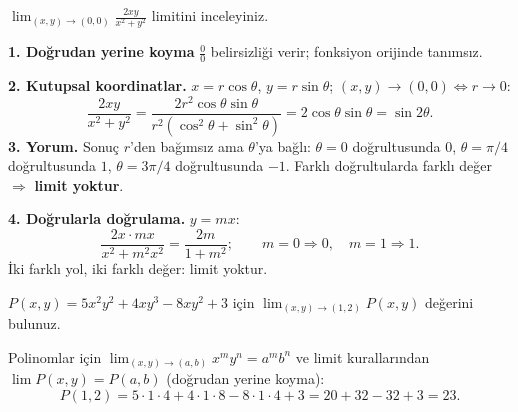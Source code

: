 \begin{soru}
$\displaystyle\lim_{(x,y)\to(0,0)}\frac{2xy}{x^2+y^2}$ limitini inceleyiniz.
\end{soru}
\begin{cevap}
\textbf{1. Doğrudan yerine koyma} $\frac00$ belirsizliği verir; fonksiyon orijinde tanımsız.

\textbf{2. Kutupsal koordinatlar.} $x=r\cos\theta$, $y=r\sin\theta$; $(x,y)\to(0,0)\Leftrightarrow r\to0$:
\[
\frac{2xy}{x^2+y^2}=\frac{2r^2\cos\theta\sin\theta}{r^2(\cos^2\theta+\sin^2\theta)}=2\cos\theta\sin\theta=\sin2\theta .
\]
\textbf{3. Yorum.} Sonuç $r$'den bağımsız ama $\theta$'ya bağlı: $\theta=0$ doğrultusunda $0$, $\theta=\pi/4$
doğrultusunda $1$, $\theta=3\pi/4$ doğrultusunda $-1$. Farklı doğrultularda farklı değer $\Rightarrow$ \textbf{limit
yoktur}.

\textbf{4. Doğrularla doğrulama.} $y=mx$:
\[
\frac{2x\cdot mx}{x^2+m^2x^2}=\frac{2m}{1+m^2};\qquad m=0\Rightarrow0,\quad m=1\Rightarrow1 .
\]
İki farklı yol, iki farklı değer: limit yoktur.
\end{cevap}

\begin{soru}
$P(x,y)=5x^2y^2+4xy^3-8xy^2+3$ için $\displaystyle\lim_{(x,y)\to(1,2)}P(x,y)$ değerini bulunuz.
\end{soru}
\begin{cevap}
Polinomlar için $\lim_{(x,y)\to(a,b)}x^my^n=a^mb^n$ ve limit kurallarından $\lim P(x,y)=P(a,b)$ (doğrudan yerine koyma):
\[
P(1,2)=5\cdot1\cdot4+4\cdot1\cdot8-8\cdot1\cdot4+3=20+32-32+3=\boxed{23}.
\]
\end{cevap}

